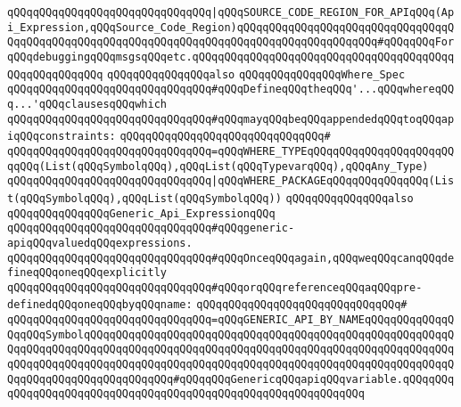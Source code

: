 \verb|qQQqqQQqqQQqqQQqqQQqqQQqqQQqqQQq|\verb#|qQQqSOURCE_CODE_REGION_FOR_APIqQQq(Api_Expression,qQQqSource_Code_Region)qQQqqQQqqQQqqQQqqQQqqQQqqQQqqQQqqQQqqQQqqQQqqQQqqQQqqQQqqQQqqQQqqQQqqQQqqQQqqQQqqQQqqQQqqQQq#\verb|#qQQqqQQqForqQQqdebuggingqQQqmsgsqQQqetc.qQQqqQQqqQQqqQQqqQQqqQQqqQQqqQQqqQQqqQQqqQQqqQQqqQQqqQQq|\newline
\newline
\newline
\newline
\verb|qQQqqQQqqQQqqQQqalso|\newline
\verb|qQQqqQQqqQQqqQQqWhere_Spec|\newline
\newline
\verb|qQQqqQQqqQQqqQQqqQQqqQQqqQQqqQQq#qQQqDefineqQQqtheqQQq'...qQQqwhereqQQq...'qQQqclausesqQQqwhich|\newline
\verb|qQQqqQQqqQQqqQQqqQQqqQQqqQQqqQQq#qQQqmayqQQqbeqQQqappendedqQQqtoqQQqapiqQQqconstraints:|\newline
\verb|qQQqqQQqqQQqqQQqqQQqqQQqqQQqqQQq#|\newline
\verb|qQQqqQQqqQQqqQQqqQQqqQQqqQQqqQQq=qQQqWHERE_TYPEqQQqqQQqqQQqqQQqqQQqqQQqqQQq(List(qQQqSymbolqQQq),qQQqList(qQQqTypevarqQQq),qQQqAny_Type)|\newline
\verb|qQQqqQQqqQQqqQQqqQQqqQQqqQQqqQQq|\verb#|qQQqWHERE_PACKAGEqQQqqQQqqQQqqQQq(List(qQQqSymbolqQQq),qQQqList(qQQqSymbolqQQq))#\newline
\newline
\newline
\newline
\verb|qQQqqQQqqQQqqQQqalso|\newline
\verb|qQQqqQQqqQQqqQQqGeneric_Api_ExpressionqQQq|\newline
\newline
\verb|qQQqqQQqqQQqqQQqqQQqqQQqqQQqqQQq#qQQqgeneric-apiqQQqvaluedqQQqexpressions.|\newline
\verb|qQQqqQQqqQQqqQQqqQQqqQQqqQQqqQQq#qQQqOnceqQQqagain,qQQqweqQQqcanqQQqdefineqQQqoneqQQqexplicitly|\newline
\verb|qQQqqQQqqQQqqQQqqQQqqQQqqQQqqQQq#qQQqorqQQqreferenceqQQqaqQQqpre-definedqQQqoneqQQqbyqQQqname:|\newline
\verb|qQQqqQQqqQQqqQQqqQQqqQQqqQQqqQQq#|\newline
\verb|qQQqqQQqqQQqqQQqqQQqqQQqqQQqqQQq=qQQqGENERIC_API_BY_NAMEqQQqqQQqqQQqqQQqqQQqSymbolqQQqqQQqqQQqqQQqqQQqqQQqqQQqqQQqqQQqqQQqqQQqqQQqqQQqqQQqqQQqqQQqqQQqqQQqqQQqqQQqqQQqqQQqqQQqqQQqqQQqqQQqqQQqqQQqqQQqqQQqqQQqqQQqqQQqqQQqqQQqqQQqqQQqqQQqqQQqqQQqqQQqqQQqqQQqqQQqqQQqqQQqqQQqqQQqqQQqqQQqqQQqqQQqqQQqqQQqqQQqqQQq#qQQqqQQqGenericqQQqapiqQQqvariable.qQQqqQQqqQQqqQQqqQQqqQQqqQQqqQQqqQQqqQQqqQQqqQQqqQQqqQQqqQQqqQQq|\newline
